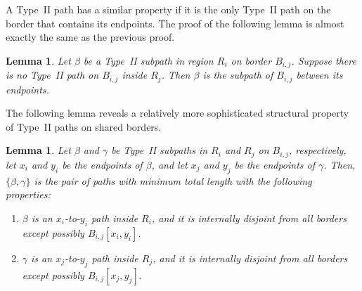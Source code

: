 \documentclass[11pt,twoside]{article}
\newtheorem{lemma}[theorem]{Lemma}
\newcommand{\region}[1]{R_{#1}}
\newcommand{\border}[2]{B_{#1,#2}}
\begin{document}
A Type~II path has a similar property if it is the only Type~II path on the border that contains its endpoints. The proof of the following lemma is almost exactly the same as the previous proof.
\begin{lemma} 
\label{lem:beta_opt0}
Let $\beta$ be a Type~II subpath in region $\region{i}$ on border $\border{i}{j}$.  Suppose there is no Type~II path on $\border{i}{j}$ inside $\region{j}$.
Then $\beta$ is the subpath of $\border{i}{j}$ between its endpoints.  \end{lemma}

The following lemma reveals a relatively more sophisticated structural property of Type~II paths on shared borders.

\begin{lemma}
\label{lem:beta_opt}
Let $\beta$ and $\gamma$ be  Type~II subpaths in $\region{i}$ and $\region{j}$ on $\border{i}{j}$, respectively, let $x_i$ and $y_i$ be the endpoints of $\beta$, and let $x_j$ and $y_j$ be the endpoints of $\gamma$.
Then, $\{\beta, \gamma\}$ is the pair of paths with \emph{minimum total length} with the following properties:
\begin{enumerate}[(1)]
\item $\beta$ is an $x_i$-to-$y_i$ path inside $\region{i}$, and it is internally disjoint from all borders except possibly $\border{i}{j}[x_i, y_i]$.
\item $\gamma$ is an $x_j$-to-$y_j$ path inside $\region{j}$, and it is internally disjoint from all borders except possibly $\border{i}{j}[x_j, y_j]$.  \end{enumerate}
\end{lemma}
\end{document}
